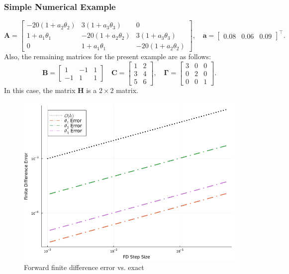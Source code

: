 \documentclass[
  pdf,
  10pt,
  xcolor={svgnames},
]{beamer}
\newcommand{\mbf}[1]{\mathbf{#1}}
\newcommand{\mat}[1]{\mathbf{{#1}}}
\begin{document}
\begin{frame}
  \frametitle{Simple Numerical Example}
  \[
    \mat{A} = \begin{bmatrix}
      -20 (1 + a_2\theta_2) & 3(1 + a_3\theta_3)    & 0                     \\
      1 + a_1 \theta_1      & -20 (1 + a_2\theta_2) & 3(1 + a_3\theta_3)    \\
      0                     & 1 + a_1 \theta_1      & -20 (1 + a_2\theta_2)
    \end{bmatrix}, \quad \mbf{a} = \begin{bmatrix}0.08 & 0.06 & 0.09\end{bmatrix}^\top.
  \]
  Also, the remaining matrices for the present example are as follows:
  \[
    \mat{B} = \begin{bmatrix} 1 & -1 & 1 \\  -1 & 1 & 1 \end{bmatrix} \quad
    \mat{C} = \begin{bmatrix} 1 & 2 \\ 3 & 4 \\  5 & 6\end{bmatrix}, \quad
    \mat{\Gamma} = \begin{bmatrix} 3 & 0 & 0\\ 0 & 2 & 0 \\ 0 & 0 & 1\end{bmatrix}.
  \]
  In this case, the matrix $\mat{H}$ is a $2 \times 2$ matrix.
\end{frame}
\begin{frame}
  \begin{figure}
    \centering
    \includegraphics[width=.8\textwidth]{./resources/findim_fd_err.png}
    \caption{Forward finite difference error vs. exact}
  \end{figure}
\end{frame}
\end{document}
